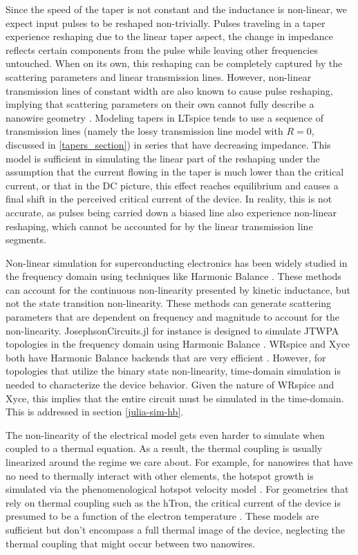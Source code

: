 Since the speed of the taper is not constant and the inductance is non-linear,
we expect input pulses to be reshaped non-trivially. Pulses traveling
in a taper experience reshaping due to the linear taper aspect, the change in impedance
reflects certain components from the pulse while leaving other frequencies untouched.
When on its own, this reshaping can be completely captured by the scattering parameters and linear 
transmission lines. 
However,
non-linear transmission lines of constant width are also known to cause pulse reshaping, 
implying that scattering parameters on their own cannot fully describe a nanowire geometry
\cite{nl_tline_reshape}. 
Modeling tapers in LTspice tends to use a
sequence of transmission lines (namely the lossy transmission line model with $R=0$, 
discussed in \ref{tapers_section}) in series that have decreasing impedance. 
This model
is sufficient in simulating the linear part of the reshaping under the assumption
that the current flowing in the taper is much lower than the critical current, or
that in the DC picture, this effect reaches equilibrium and causes a final shift in the
perceived critical current of the device. In reality, this is not accurate, as pulses
being carried down a biased line also experience non-linear reshaping, which cannot
be accounted for by the linear transmission line segments.

Non-linear simulation for superconducting electronics has been widely studied in the 
frequency domain
using techniques like Harmonic Balance \cite{hb-book}. 
These methods can account for the continuous 
non-linearity presented by kinetic inductance, but not the state transition non-linearity.
These methods can generate scattering parameters that are dependent on frequency and
magnitude to account for the non-linearity.
JosephsonCircuits.jl for instance is designed
to simulate JTWPA topologies in the frequency domain using Harmonic Balance \cite{josephsoncircsjl}. WRspice
and Xyce both have Harmonic Balance backends that are very efficient \cite{wrspice, xyce_reference}. However,
for topologies that utilize the binary state non-linearity, time-domain simulation 
is needed to characterize the device behavior. Given the nature of WRspice and Xyce,
this implies that the entire circuit must be simulated in the time-domain. This is
addressed in section \ref{julia-sim-hb}.

The non-linearity of the electrical model gets even harder to simulate when coupled to
a thermal equation. As a result, the thermal coupling is usually linearized around the 
regime we care about. For example, for nanowires that have no need to thermally
interact with other elements, the hotspot growth is simulated via the phenomenological
hotspot velocity model \cite{phen_model, matteo_thesis}. 
For geometries that rely on thermal coupling such as the hTron, the critical current
of the device is presumed to be a function of the electron temperature \cite{matteo_thesis}.
These models are sufficient but don't encompass a full thermal image of the device,
neglecting the thermal coupling that might occur between two nanowires.

